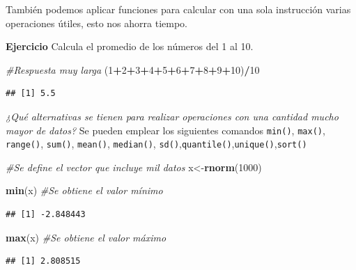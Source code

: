 \documentclass[
]{book}
\newenvironment{Shaded}{\begin{snugshade}}{\end{snugshade}}
\newcommand{\CommentTok}[1]{\textcolor[rgb]{0.56,0.35,0.01}{\textit{#1}}}
\newcommand{\DecValTok}[1]{\textcolor[rgb]{0.00,0.00,0.81}{#1}}
\newcommand{\FunctionTok}[1]{\textcolor[rgb]{0.13,0.29,0.53}{\textbf{#1}}}
\newcommand{\NormalTok}[1]{#1}
\newcommand{\OtherTok}[1]{\textcolor[rgb]{0.56,0.35,0.01}{#1}}
\newcommand{\SpecialCharTok}[1]{\textcolor[rgb]{0.81,0.36,0.00}{\textbf{#1}}}
\begin{document}
También podemos aplicar funciones para calcular con una sola instrucción varias operaciones útiles, esto nos ahorra tiempo.

\textbf{Ejercicio} Calcula el promedio de los números del 1 al 10.

\begin{Shaded}
\begin{Highlighting}[]
\CommentTok{\#Respuesta muy larga }
\NormalTok{(}\DecValTok{1}\SpecialCharTok{+}\DecValTok{2}\SpecialCharTok{+}\DecValTok{3}\SpecialCharTok{+}\DecValTok{4}\SpecialCharTok{+}\DecValTok{5}\SpecialCharTok{+}\DecValTok{6}\SpecialCharTok{+}\DecValTok{7}\SpecialCharTok{+}\DecValTok{8}\SpecialCharTok{+}\DecValTok{9}\SpecialCharTok{+}\DecValTok{10}\NormalTok{)}\SpecialCharTok{/}\DecValTok{10}
\end{Highlighting}
\end{Shaded}

\begin{verbatim}
## [1] 5.5
\end{verbatim}

\emph{¿Qué alternativas se tienen para realizar operaciones con una cantidad mucho mayor de datos?} Se pueden emplear los siguientes comandos \texttt{min()}, \texttt{max()}, \texttt{range()}, \texttt{sum()}, \texttt{mean()}, \texttt{median()}, \texttt{sd()},\texttt{quantile()},\texttt{unique()},\texttt{sort()}

\begin{Shaded}
\begin{Highlighting}[]
\CommentTok{\#Se define el vector que incluye mil datos}
\NormalTok{x}\OtherTok{\textless{}{-}}\FunctionTok{rnorm}\NormalTok{(}\DecValTok{1000}\NormalTok{)}

\FunctionTok{min}\NormalTok{(x) }\CommentTok{\#Se obtiene el valor mínimo}
\end{Highlighting}
\end{Shaded}

\begin{verbatim}
## [1] -2.848443
\end{verbatim}

\begin{Shaded}
\begin{Highlighting}[]
\FunctionTok{max}\NormalTok{(x) }\CommentTok{\#Se obtiene el valor máximo}
\end{Highlighting}
\end{Shaded}

\begin{verbatim}
## [1] 2.808515
\end{verbatim}
\end{document}
